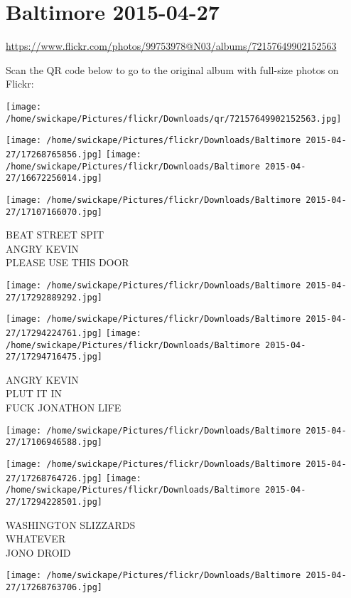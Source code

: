 \documentclass[10pt,letterpaper]{article}
\title{}
\author{}
\date{}
\begin{document}
\section*{Baltimore 2015-04-27}

\url{https://www.flickr.com/photos/99753978@N03/albums/72157649902152563}

Scan the QR code below to go to the original album with full-size photos on Flickr:

\texttt{[image: /home/swickape/Pictures/flickr/Downloads/qr/72157649902152563.jpg]}
\pagebreak

\texttt{[image: /home/swickape/Pictures/flickr/Downloads/Baltimore 2015-04-27/17268765856.jpg]}
\texttt{[image: /home/swickape/Pictures/flickr/Downloads/Baltimore 2015-04-27/16672256014.jpg]}

\texttt{[image: /home/swickape/Pictures/flickr/Downloads/Baltimore 2015-04-27/17107166070.jpg]}

BEAT STREET SPIT\\
ANGRY KEVIN\\
PLEASE USE THIS DOOR
\pagebreak

\texttt{[image: /home/swickape/Pictures/flickr/Downloads/Baltimore 2015-04-27/17292889292.jpg]}

\vspace{0.25in}
\texttt{[image: /home/swickape/Pictures/flickr/Downloads/Baltimore 2015-04-27/17294224761.jpg]}
\texttt{[image: /home/swickape/Pictures/flickr/Downloads/Baltimore 2015-04-27/17294716475.jpg]}

ANGRY KEVIN\\
PLUT IT IN\\
FUCK JONATHON LIFE
\pagebreak

\texttt{[image: /home/swickape/Pictures/flickr/Downloads/Baltimore 2015-04-27/17106946588.jpg]}

\vspace{0.25in}
\texttt{[image: /home/swickape/Pictures/flickr/Downloads/Baltimore 2015-04-27/17268764726.jpg]}
\texttt{[image: /home/swickape/Pictures/flickr/Downloads/Baltimore 2015-04-27/17294228501.jpg]}

WASHINGTON SLIZZARDS\\
WHATEVER\\
JONO DROID
\pagebreak

\texttt{[image: /home/swickape/Pictures/flickr/Downloads/Baltimore 2015-04-27/17268763706.jpg]}
\end{document}
